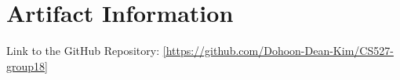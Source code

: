 \section{Artifact Information}

Link to the GitHub Repository: \url{[https://github.com/Dohoon-Dean-Kim/CS527-group18]} 

